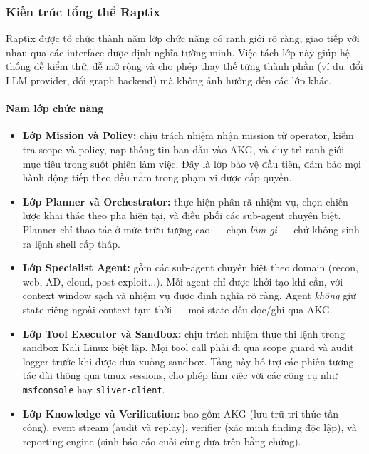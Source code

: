 
\subsubsection{Kiến trúc tổng thể Raptix}
\label{sec:kien-truc-tong-the}

Raptix được tổ chức thành năm lớp chức năng có ranh giới rõ ràng, giao tiếp với nhau qua các interface được định nghĩa tường minh. Việc tách lớp này giúp hệ thống dễ kiểm thử, dễ mở rộng và cho phép thay thế từng thành phần (ví dụ: đổi LLM provider, đổi graph backend) mà không ảnh hưởng đến các lớp khác.

\paragraph{Năm lớp chức năng}

\begin{itemize}
    \item \textbf{Lớp Mission và Policy:} chịu trách nhiệm nhận mission từ operator, kiểm tra scope và policy, nạp thông tin ban đầu vào AKG, và duy trì ranh giới mục tiêu trong suốt phiên làm việc. Đây là lớp bảo vệ đầu tiên, đảm bảo mọi hành động tiếp theo đều nằm trong phạm vi được cấp quyền.
    \item \textbf{Lớp Planner và Orchestrator:} thực hiện phân rã nhiệm vụ, chọn chiến lược khai thác theo pha hiện tại, và điều phối các sub-agent chuyên biệt. Planner chỉ thao tác ở mức trừu tượng cao — chọn \emph{làm gì} — chứ không sinh ra lệnh shell cấp thấp.
    \item \textbf{Lớp Specialist Agent:} gồm các sub-agent chuyên biệt theo domain (recon, web, AD, cloud, post-exploit...). Mỗi agent chỉ được khởi tạo khi cần, với context window sạch và nhiệm vụ được định nghĩa rõ ràng. Agent \emph{không} giữ state riêng ngoài context tạm thời — mọi state đều đọc/ghi qua AKG.
    \item \textbf{Lớp Tool Executor và Sandbox:} chịu trách nhiệm thực thi lệnh trong sandbox Kali Linux biệt lập. Mọi tool call phải đi qua scope guard và audit logger trước khi được đưa xuống sandbox. Tầng này hỗ trợ các phiên tương tác dài thông qua tmux sessions, cho phép làm việc với các công cụ như \texttt{msfconsole} hay \texttt{sliver-client}.
    \item \textbf{Lớp Knowledge và Verification:} bao gồm AKG (lưu trữ tri thức tấn công), event stream (audit và replay), verifier (xác minh finding độc lập), và reporting engine (sinh báo cáo cuối cùng dựa trên bằng chứng).
\end{itemize}

